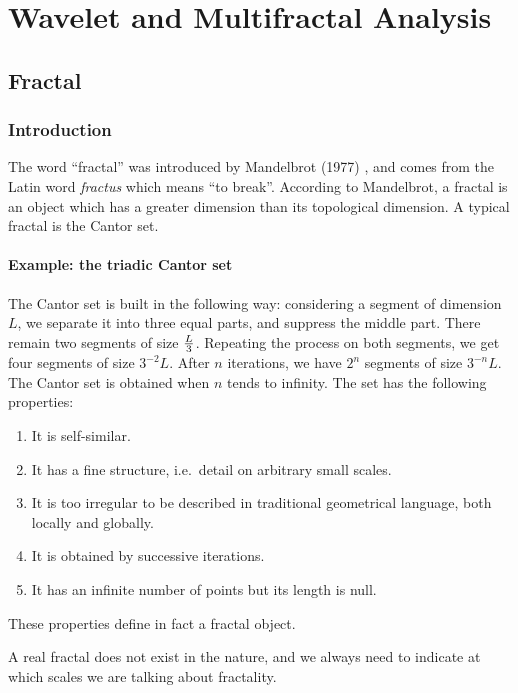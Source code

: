 \chapter{\proj Wavelet and Multifractal Analysis}
\label{ch_fractal}

\section{Fractal}
\subsection{Introduction}
The word ``fractal'' was introduced by Mandelbrot 
(1977) \cite{frac:mandel83}, and
comes from the Latin word {\em fractus} which means ``to break''.
According to Mandelbrot, a fractal is an object which has 
a greater dimension than its topological dimension. A typical
fractal is the Cantor set.
 
\subsubsection*{Example: the triadic Cantor set} 
\label{triadic Cantor set}
The Cantor set is built in the following way: considering a
segment of dimension $L$, we separate it into three equal parts,
and suppress the middle part. There remain two segments of size
${L \over 3}$. Repeating the process on both segments, we get 
four segments of size ${3^{-2}L}$. After $n$ iterations, we have
$2^n$ segments of size ${3^{-n}L}$. The Cantor set is obtained 
when $n$ tends to infinity. The set has the following properties:
\begin{enumerate}
\item It is self-similar.
\item It has a fine structure, i.e.\ detail on arbitrary small
scales.
\item It is too irregular to be described in traditional 
geometrical language, both locally and globally.
\item It is obtained by successive iterations.
\item It has an infinite number of points but its length is null.
\end{enumerate}
These properties define in fact a fractal object. 

A real fractal does not exist in the nature, and we always need
to indicate at which scales we are talking about fractality.

